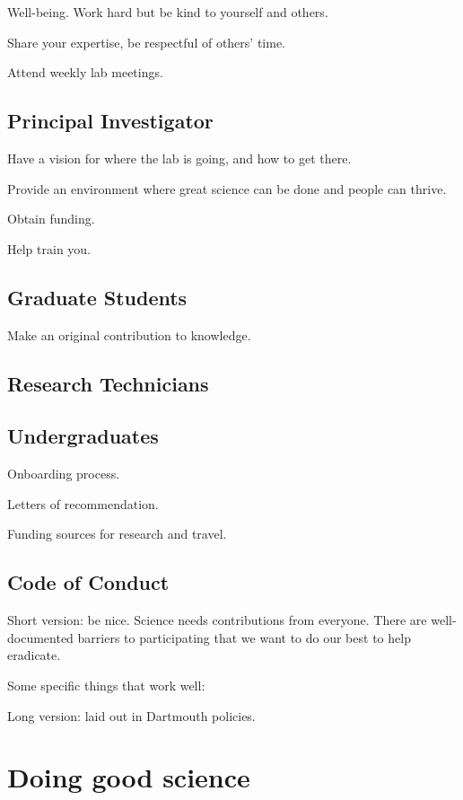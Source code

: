 \documentclass{tufte-book}
\begin{document}
Well-being. Work hard but be kind to yourself and others.

Share your expertise, be respectful of others' time.

Attend weekly lab meetings.


\section{Principal Investigator}

Have a vision for where the lab is going, and how to get there.

Provide an environment where great science can be done and people can thrive.

Obtain funding.

Help train you.

\section{Graduate Students}\label{sec:gradstudents}

Make an original contribution to knowledge.

\section{Research Technicians}


\section{Undergraduates}

Onboarding process.

Letters of recommendation.

Funding sources for research and travel.


\section{Code of Conduct}

Short version: be nice. Science needs contributions from
everyone. There are well-documented barriers to participating that we
want to do our best to help eradicate.

Some specific things that work well:

Long version: laid out in Dartmouth policies.

\chapter{Doing good science}
\end{document}
